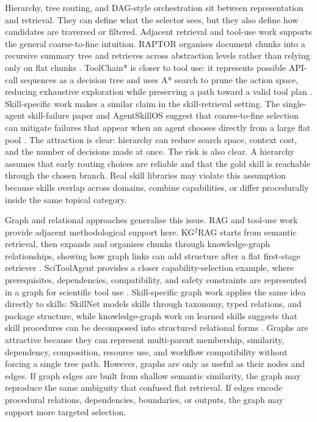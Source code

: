 Hierarchy, tree routing, and DAG-style orchestration sit between representation and retrieval. They can define what the selector sees, but they also define how candidates are traversed or filtered. Adjacent retrieval and tool-use work supports the general coarse-to-fine intuition. RAPTOR organises document chunks into a recursive summary tree and retrieves across abstraction levels rather than relying only on flat chunks \cite{sarthi2024raptor}. ToolChain* is closer to tool use: it represents possible API-call sequences as a decision tree and uses A* search to prune the action space, reducing exhaustive exploration while preserving a path toward a valid tool plan \cite{zhuang2024toolchain}. Skill-specific work makes a similar claim in the skill-retrieval setting. The single-agent skill-failure paper and AgentSkillOS suggest that coarse-to-fine selection can mitigate failures that appear when an agent chooses directly from a large flat pool \cite{li2026singleagent,li2026agentskillos}. The attraction is clear: hierarchy can reduce search space, context cost, and the number of decisions made at once. The risk is also clear. A hierarchy assumes that early routing choices are reliable and that the gold skill is reachable through the chosen branch. Real skill libraries may violate this assumption because skills overlap across domains, combine capabilities, or differ procedurally inside the same topical category.

Graph and relational approaches generalise this issue. RAG and tool-use work provide adjacent methodological support here. KG$^2$RAG starts from semantic retrieval, then expands and organises chunks through knowledge-graph relationships, showing how graph links can add structure after a flat first-stage retriever \cite{zhu2025kg2rag}. SciToolAgent provides a closer capability-selection example, where prerequisites, dependencies, compatibility, and safety constraints are represented in a graph for scientific tool use \cite{ding2025scitoolagent}. Skill-specific graph work applies the same idea directly to skills: SkillNet models skills through taxonomy, typed relations, and package structure, while knowledge-graph work on learned skills suggests that skill procedures can be decomposed into structured relational forms \cite{liang2026skillnet,learningkg2026}. Graphs are attractive because they can represent multi-parent membership, similarity, dependency, composition, resource use, and workflow compatibility without forcing a single tree path. However, graphs are only as useful as their nodes and edges. If graph edges are built from shallow semantic similarity, the graph may reproduce the same ambiguity that confused flat retrieval. If edges encode procedural relations, dependencies, boundaries, or outputs, the graph may support more targeted selection.


